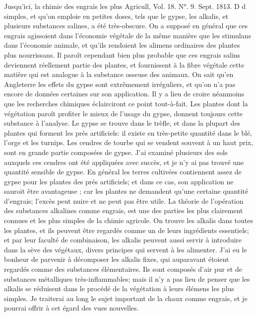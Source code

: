 Jusqu'ici, la chimie des engrais les plus
Agricull, Vol. 18. N°. 9. Sept. 1813. D d\setcounter{page}{346} simples, et qu'on emploie en petites doses, tels que le gypse, les alkalis, et plusieurs substances salines, a été très-obscure. On a supposé en général que ces engrais agissoient dans l'économie végétale de la même manière que les stimulans dans l'économie animale, et qu'ils rendoient les alimens ordinaires des plantes plus nourrissans. Il paroît cependant bien plus probable que ces engrais salins deviennent réellement partie des plantes, et fournissent à la fibre végétale cette matière qui est analogue à la substance osseuse des animaux. On sait qu'en Angleterre les effets du gypse sont extrêmement irréguliers, et qu'on n'a pas encore de données certaines sur son application. Il y a lieu de croire néanmoins que les recherches chimiques éclairciront ce point tout-à-fait. Les plantes dont la végétation paroît profiter le mieux de l'usage du gypse, donnent toujours cette substance à l'analyse. Le gypse se trouve dans le trèfle, et dans la plupart des plantes qui forment les prés artificiels: il existe en très-petite quantité dans le blé, l'orge et les turnips. Les cendres de tourbe qui se vendent souvent à un haut prix, sont en grande partie composées de gypse. J'ai examiné plusieurs des sols auxquels ces cendres ont été appliquées avec succès, et je n'y ai\setcounter{page}{347} pas trouvé une quantité sensible de gypse. En général les terres cultivées contiennent assez de gypse pour les plantes des prés artificiels; et dans ce cas, son application ne sauroit être avantageuse ; car les plantes ne demandent qu'une certaine quantité d'engrais; l'excès peut nuire et ne peut pas être utile.
La théorie de l'opération des substances alkalines comme engrais, est une des parties les plus clairement connues et les plus simples de la chimie agricole. On trouve les alkalis dans toutes les plantes, et ils peuvent être regardés comme un de leurs ingrédients essentiels; et par leur faculté de combinaison, les alkalis peuvent aussi servir à introduire dans la sève des végétaux, divers principes qui servent à les alimenter.
J'ai eu le bonheur de parvenir à décomposer les alkalis fixes, qui auparavant étoient regardés comme des substances élémentaires. Ils sont composés d'air pur et de substances métalliques très-inflammables; mais il n'y a pas lieu de penser que les alkalis se réduisent dans le procédé de la végétation à leurs élémens les plus simples.
Je traiterai au long le sujet important de la chaux comme engrais, et je pourrai offrir à cet égard des vues nouvelles.
